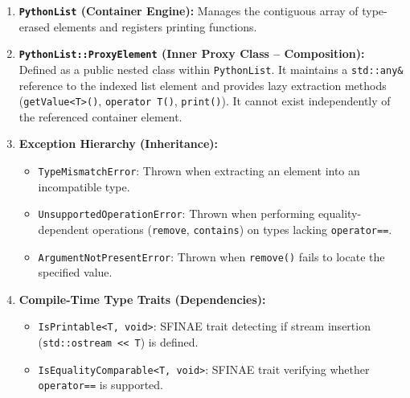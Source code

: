 \documentclass[12pt,a4paper]{report}
\begin{document}
\begin{enumerate}
    \item \textbf{\texttt{PythonList} (Container Engine):} Manages the contiguous array of type-erased elements and registers printing functions.
    \item \textbf{\texttt{PythonList::ProxyElement} (Inner Proxy Class -- Composition):} Defined as a public nested class within \texttt{PythonList}. It maintains a \texttt{std::any\&} reference to the indexed list element and provides lazy extraction methods (\texttt{getValue<T>()}, \texttt{operator T()}, \texttt{print()}). It cannot exist independently of the referenced container element.
    \item \textbf{Exception Hierarchy (Inheritance):}
    \begin{itemize}
        \item \texttt{TypeMismatchError}: Thrown when extracting an element into an incompatible type.
        \item \texttt{UnsupportedOperationError}: Thrown when performing equality-dependent operations (\texttt{remove}, \texttt{contains}) on types lacking \texttt{operator==}.
        \item \texttt{ArgumentNotPresentError}: Thrown when \texttt{remove()} fails to locate the specified value.
    \end{itemize}
    \item \textbf{Compile-Time Type Traits (Dependencies):}
    \begin{itemize}
        \item \texttt{IsPrintable<T, void>}: SFINAE trait detecting if stream insertion (\texttt{std::ostream << T}) is defined.
        \item \texttt{IsEqualityComparable<T, void>}: SFINAE trait verifying whether \texttt{operator==} is supported.
    \end{itemize}
\end{enumerate}
\end{document}

